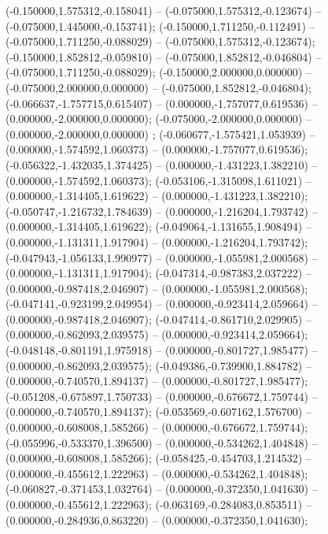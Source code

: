  (-0.150000,1.575312,-0.158041) -- (-0.075000,1.575312,-0.123674) -- (-0.075000,1.445000,-0.153741);
 (-0.150000,1.711250,-0.112491) -- (-0.075000,1.711250,-0.088029) -- (-0.075000,1.575312,-0.123674);
 (-0.150000,1.852812,-0.059810) -- (-0.075000,1.852812,-0.046804) -- (-0.075000,1.711250,-0.088029);
 (-0.150000,2.000000,0.000000) -- (-0.075000,2.000000,0.000000) -- (-0.075000,1.852812,-0.046804);
 (-0.066637,-1.757715,0.615407) -- (0.000000,-1.757077,0.619536) -- (0.000000,-2.000000,0.000000);
 (-0.075000,-2.000000,0.000000) -- (0.000000,-2.000000,0.000000) ;
 (-0.060677,-1.575421,1.053939) -- (0.000000,-1.574592,1.060373) -- (0.000000,-1.757077,0.619536);
 (-0.056322,-1.432035,1.374425) -- (0.000000,-1.431223,1.382210) -- (0.000000,-1.574592,1.060373);
 (-0.053106,-1.315098,1.611021) -- (0.000000,-1.314405,1.619622) -- (0.000000,-1.431223,1.382210);
 (-0.050747,-1.216732,1.784639) -- (0.000000,-1.216204,1.793742) -- (0.000000,-1.314405,1.619622);
 (-0.049064,-1.131655,1.908494) -- (0.000000,-1.131311,1.917904) -- (0.000000,-1.216204,1.793742);
 (-0.047943,-1.056133,1.990977) -- (0.000000,-1.055981,2.000568) -- (0.000000,-1.131311,1.917904);
 (-0.047314,-0.987383,2.037222) -- (0.000000,-0.987418,2.046907) -- (0.000000,-1.055981,2.000568);
 (-0.047141,-0.923199,2.049954) -- (0.000000,-0.923414,2.059664) -- (0.000000,-0.987418,2.046907);
 (-0.047414,-0.861710,2.029905) -- (0.000000,-0.862093,2.039575) -- (0.000000,-0.923414,2.059664);
 (-0.048148,-0.801191,1.975918) -- (0.000000,-0.801727,1.985477) -- (0.000000,-0.862093,2.039575);
 (-0.049386,-0.739900,1.884782) -- (0.000000,-0.740570,1.894137) -- (0.000000,-0.801727,1.985477);
 (-0.051208,-0.675897,1.750733) -- (0.000000,-0.676672,1.759744) -- (0.000000,-0.740570,1.894137);
 (-0.053569,-0.607162,1.576700) -- (0.000000,-0.608008,1.585266) -- (0.000000,-0.676672,1.759744);
 (-0.055996,-0.533370,1.396500) -- (0.000000,-0.534262,1.404848) -- (0.000000,-0.608008,1.585266);
 (-0.058425,-0.454703,1.214532) -- (0.000000,-0.455612,1.222963) -- (0.000000,-0.534262,1.404848);
 (-0.060827,-0.371453,1.032764) -- (0.000000,-0.372350,1.041630) -- (0.000000,-0.455612,1.222963);
 (-0.063169,-0.284083,0.853511) -- (0.000000,-0.284936,0.863220) -- (0.000000,-0.372350,1.041630);
